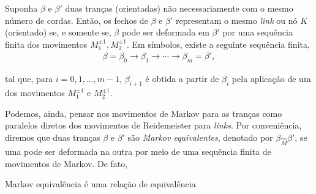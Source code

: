 	\begin{theorem}[Markov]
		\label{teorema de Markov}
		Suponha $\beta$ e $\beta'$ duas tranças (orientadas) não necessariamente com o mesmo número de cordas. Então, os fechos de $\beta$ e $\beta'$ representam o mesmo \textit{link} ou nó $K$ (orientado) se, e somente se, $\beta$ pode ser deformada em $\beta'$ por uma sequência finita dos movimentos $M_1^{\pm1}, M_2^{\pm1}$. Em símbolos, existe a seguinte sequência finita,
		\begin{align*}
		\beta = \beta_0\to\beta_1\to\cdots\to\beta_m = \beta',
		\end{align*}
		\par\vspace{0.3cm} tal que, para $i = 0,1,\dots,m-1$, $\beta_{i+1}$ é obtida a partir de $\beta_i$ pela aplicação de um dos movimentos $M_1^{\pm1}$ e $M_2^{\pm1}$.
	\end{theorem}
	\par\vspace{0.3cm} Podemos, ainda, pensar nos movimentos de Markov para as tranças como paralelos diretos dos movimentos de Reidemeister para \textit{links}. Por conveniência, diremos que duas tranças $\beta$ e $\beta'$ são \textit{Markov equivalentes}, denotado por $\beta\underset{M}{\sim}\beta'$, se uma pode ser deformada na outra por meio de uma sequência finita de movimentos de Markov. De fato,
	\begin{prop}
		\label{Markov equivalencia}
		Markov equivalência é uma relação de equivalência.
	\end{prop}  
